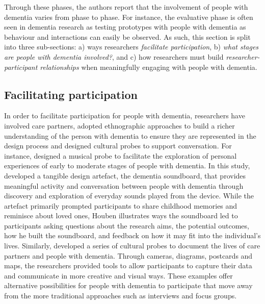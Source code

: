 Through these phases, the authors report that the involvement of people with dementia varies from phase to phase. For instance, the evaluative phase is often seen in dementia research as testing prototypes with people with dementia as behaviour and interactions can easily be observed. As such, this section is split into three sub-sections: a) ways researchers \textit{facilitate participation}, b) \textit{what stages are people with dementia involved?}, and c) how researchers must build \textit{researcher-participant relationships} when meaningfully engaging with people with dementia.

\subsection{Facilitating participation}
\label{BL:SupportParticipation}
In order to facilitate participation for people with dementia, researchers have involved care partners, adopted ethnographic approaches to build a richer understanding of the person with dementia to ensure they are represented in the design process and designed cultural probes to support conversation. For instance, \cite{houben_foregrounding_2019} designed a musical probe to facilitate the exploration of personal experiences of early to moderate stages of people with dementia. In this study, \citeauthor{houben_foregrounding_2019} developed a tangible design artefact, the dementia soundboard, that provides meaningful activity and conversation between people with dementia through discovery and exploration of everyday sounds played from the device. While the artefact primarily prompted participants to share childhood memories and reminisce about loved ones, Houben illustrates ways the soundboard led to participants asking questions about the research aims, the potential outcomes, how he built the soundboard, and feedback on how it may fit into the individual's lives. Similarly, \cite{brown2014using} developed a series of cultural probes to document the lives of care partners and people with dementia. Through cameras, diagrams, postcards and maps, the researchers provided tools to allow participants to capture their data and communicate in more creative and visual ways. These examples offer alternative possibilities for people with dementia to participate that move away from the more traditional approaches such as interviews and focus groups.

